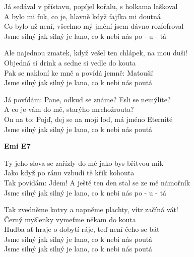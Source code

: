 \ve{}
Já sedával v přístavu, popíjel kořalu, s holkama laškoval\\
A bylo mi fuk, co je, hlavně když fajfka mi doutná\\
Co bylo už není, všechno mý jmění jsem dávno rozfofroval\\
Jsme silný jak silný je lano, co k nebi nás po - u - tá

\ve{}
Ale najednou zmatek, když vešel ten chlápek, na mou duši!\\
Objedná si drink a sedne si vedle do kouta\\
Pak se nakloní ke mně a povídá jemně: Matouši!\\
Jsme silný jak silný je lano, co k nebi nás poutá

\ve{}
Já povídám: Pane, odkud se známe? Esli se nemýlíte?\\
A co je vám do mě, starýho mrchožrouta?\\
On na to: Pojď, dej se na moji loď, má jméno Eternité\\
Jsme silný jak silný je lano, co k nebi nás poutá

\re{}
{\footnotesize \textbf{Emi E7}}

\ve{}
Ty jeho slova se zařízly do mě jako bys břitvou mik\\
Jako když po ránu vzbudí tě křik kohouta\\
Tak povídám: Jdem! A ještě ten den stal se  ze mě námořník\\
Jsme silný jak silný je lano, co k nebi nás po - u - tá

\ve{}
Tak zvedněme kotvy a napněme plachty, vítr začíná vát!\\
Černý myšlenky vymeťme někam do kouta\\
Hudba ať hraje o dobytí ráje, teď není čeho se bát\\
Jsme silný jak silný je lano, co k nebi nás poutá\\
Jsme silný jak silný je lano, co k nebi nás poutá

\esong{}